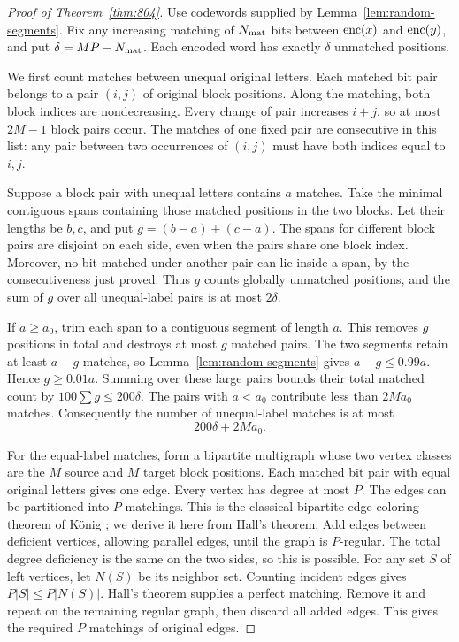 \begin{proof}[Proof of Theorem~\ref{thm:804}]
Use codewords supplied by Lemma~\ref{lem:random-segments}. Fix any
increasing matching of $N_{\rm mat}$ bits between $\operatorname{enc}(x)$ and
$\operatorname{enc}(y)$, and put $\delta=MP-N_{\rm mat}$. Each encoded word has
exactly $\delta$ unmatched positions.

We first count matches between unequal original letters. Each matched
bit pair belongs to a pair $(i,j)$ of original block positions.
Along the matching, both block indices are nondecreasing. Every change
of pair increases $i+j$, so at most $2M-1$ block pairs occur. The
matches of one fixed pair are consecutive in this list: any pair
between two occurrences of $(i,j)$ must have both indices equal to
$i,j$.

Suppose a block pair with unequal letters contains $a$ matches.
Take the minimal contiguous spans containing those matched positions
in the two blocks. Let their lengths be $b,c$, and put
$g=(b-a)+(c-a)$. The spans for different block pairs are disjoint on
each side, even when the pairs share one block index. Moreover, no bit
matched under another pair can lie inside a span, by the consecutiveness
just proved. Thus $g$ counts globally unmatched positions, and the sum
of $g$ over all unequal-label pairs is at most $2\delta$.

If $a\geq a_0$, trim each span to a contiguous segment of length $a$.
This removes $g$ positions in total and destroys at most $g$ matched
pairs. The two segments retain at least $a-g$ matches, so
Lemma~\ref{lem:random-segments} gives $a-g\leq0.99a$. Hence
$g\geq0.01a$. Summing over these large pairs bounds their total matched
count by $100\sum g\leq200\delta$. The pairs with $a<a_0$ contribute
less than $2Ma_0$ matches. Consequently the number of unequal-label
matches is at most
\begin{equation}\label{eq:unequal-code}
 200\delta+2Ma_0.
\end{equation}

For the equal-label matches, form a bipartite multigraph whose two
vertex classes are the $M$ source and $M$ target block positions.
Each matched bit pair with equal original letters gives one edge.
Every vertex has degree at most $P$. The edges can be partitioned into
$P$ matchings. This is the classical bipartite edge-coloring theorem
of K\"{o}nig \cite{Konig1916}; we derive it here from
Hall's theorem. Add edges between deficient vertices, allowing parallel
edges, until the graph is $P$-regular. The total degree deficiency is
the same on the two sides, so this is possible. For any set $S$ of
left vertices, let $N(S)$ be its neighbor set. Counting incident edges
gives $P|S|\leq P|N(S)|$. Hall's theorem
\cite[Theorem~1]{Hall1935} supplies a perfect matching. Remove it and
repeat on the remaining regular graph, then discard all added edges.
This gives the required $P$ matchings of original edges.


\end{proof}
